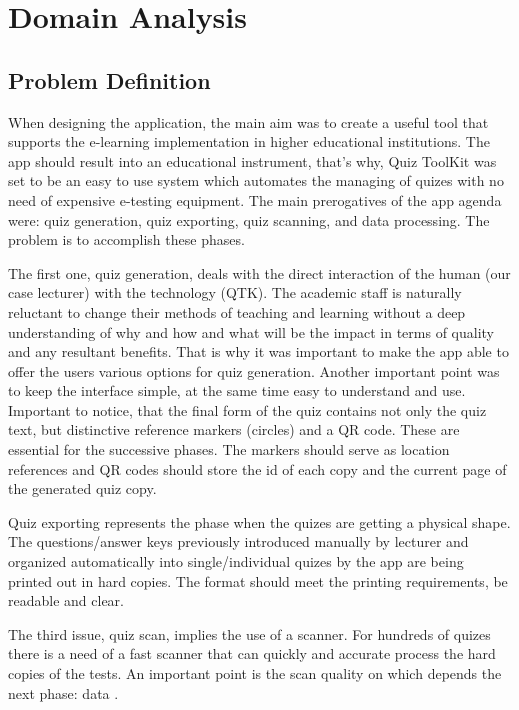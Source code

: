 \section{Domain Analysis}

\subsection{Problem Definition}

When designing the application, the main aim was to create a useful tool that supports the
e-learning implementation in higher educational institutions. The app should result into 
an educational instrument, that’s why, Quiz ToolKit was set to be an easy to use system 
which automates the managing of quizes with no need of expensive e-testing equipment. 
The main prerogatives of the app agenda were: quiz generation, quiz exporting, quiz scanning, 
and data processing. The problem is to accomplish these phases. 

The first one, quiz generation, deals with the direct interaction of the human (our case 
lecturer) with the technology (QTK). The academic staff is naturally reluctant to change their 
methods of teaching and learning without a deep understanding of why and how and what 
will be the impact in terms of quality and any resultant benefits. That is why it was 
important to make the app able to offer the users various options for quiz 
generation. Another important point was to keep the interface simple, at the same time 
easy to understand and use. Important to notice, that the final form of the quiz contains 
not only the quiz text, but distinctive reference markers (circles) and a QR code. These are 
essential for the successive phases. The markers should serve as location references and 
QR codes should store the id of each copy and the current page of the generated quiz copy.

Quiz exporting represents the phase when the quizes are getting a physical shape. The 
questions/answer keys previously introduced manually by lecturer and organized 
automatically into single/individual quizes by the app are being printed out in hard 
copies. The format should meet the printing requirements, be readable and clear. 

The third issue, quiz scan, implies the use of a scanner. For hundreds of quizes there is a 
need of a fast scanner that can quickly and accurate process the hard copies of the tests. 
An important point is the scan quality on which depends the next phase: data . 

